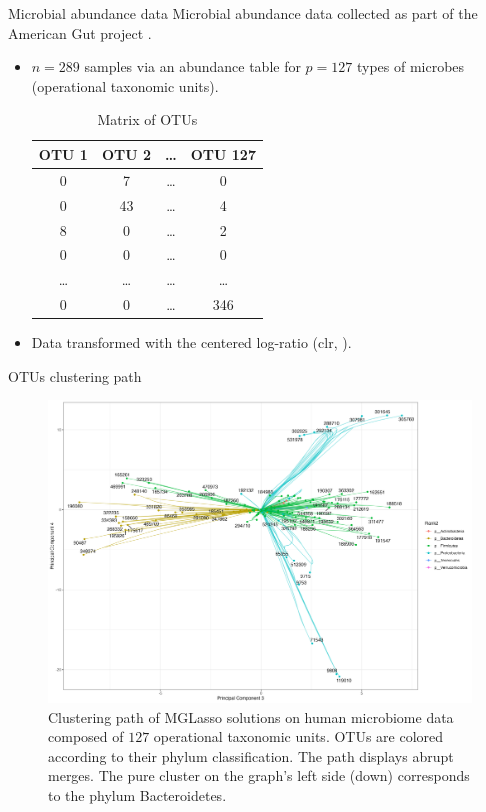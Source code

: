 \documentclass[11pt]{beamer}
\begin{document}
										\begin{frame}{Microbial abundance data}
											Microbial abundance data collected as part of the American Gut project \citep{mcdonald2018american}.
											\begin{itemize}
												\item $n = 289$ samples via an abundance table for $p = 127$ types of microbes (operational taxonomic units).
												\begin{table}[ht]
													\centering
													\begin{tabular}{cccc}
														OTU 1 & OTU 2 & \dots & OTU 127\\ 
														\hline
														0 & 7 & \dots & 0 \\ 
														0 & 43 & \dots & 4 \\ 
														8 & 0 & \dots & 2 \\ 
														0 & 0 & \dots & 0 \\ 
														\dots & \dots & \dots & \dots \\ 
														0 & 0 & \dots & 346 \\ 
													\end{tabular}
													\caption{Matrix of OTUs}
												\end{table}
												\item Data transformed with the centered log-ratio (clr, \cite{aitchison1982statistical}). 
											\end{itemize}
										\end{frame}
										
										\begin{frame}{OTUs clustering path}
											\begin{figure}[!ht]
												\centering
												\includegraphics[scale=0.3]{images/clusterpath-gut-data.png}
												\caption{Clustering path of MGLasso solutions on human microbiome data composed of $127$ operational taxonomic units. OTUs are colored according to their phylum classification. The path displays abrupt merges. The pure cluster on the graph's left side (down) corresponds to the phylum Bacteroidetes.}
												\label{fig-clusterpath}
											\end{figure}
										\end{frame}
										
\end{document}
